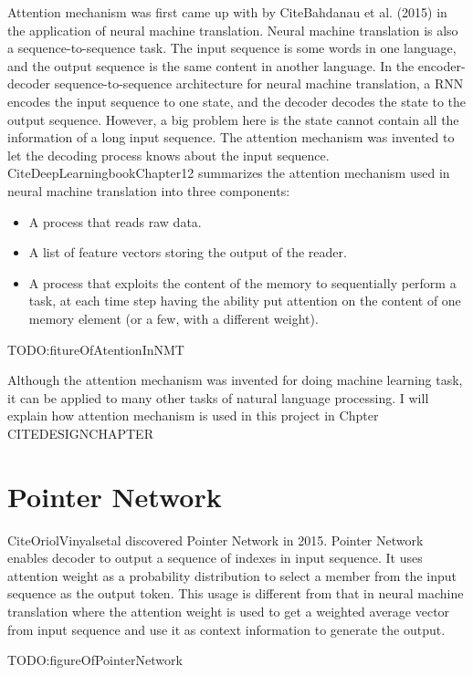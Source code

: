 \documentclass[modernstyle,12pt]{sjsuthesis}
\theoremstyle{definition}
\begin{document}
Attention mechanism was first came up with by CiteBahdanau et al. (2015) in the application of neural machine translation. Neural machine translation is also a sequence-to-sequence task. The input sequence is some words in one language, and the output sequence is the same content in another language. In the encoder-decoder sequence-to-sequence architecture for neural machine translation, a RNN encodes the input sequence to one state, and the decoder decodes the state to the output sequence. However, a big problem here is the state cannot contain all the information of a long input sequence. The attention mechanism was invented to let the decoding process knows about the input sequence. CiteDeepLearningbookChapter12 summarizes the attention mechanism used in neural machine translation into three components:
\begin{itemize}
\item{A process that reads raw data.}
\item{A list of feature vectors storing the output of the reader.}
\item{A process that exploits the content of the memory to sequentially perform a task, at each time step having the ability put attention on the content of one memory element (or a few, with a different weight).}
\end{itemize}

TODO:fitureOfAtentionInNMT

Although the attention mechanism was invented for doing machine learning task, it can be applied to many other tasks of natural language processing. I will explain how attention mechanism is used in this project in Chpter CITEDESIGNCHAPTER




\section{Pointer Network}

CiteOriolVinyalsetal discovered Pointer Network in 2015. Pointer Network enables decoder to output a sequence of indexes in input sequence. It uses attention weight as a probability distribution to select a member from the input sequence as the output token. This usage is different from that in neural machine translation where the attention weight is used to get a weighted average vector from input sequence and use it as context information to generate the output.

TODO:figureOfPointerNetwork
\end{document}
